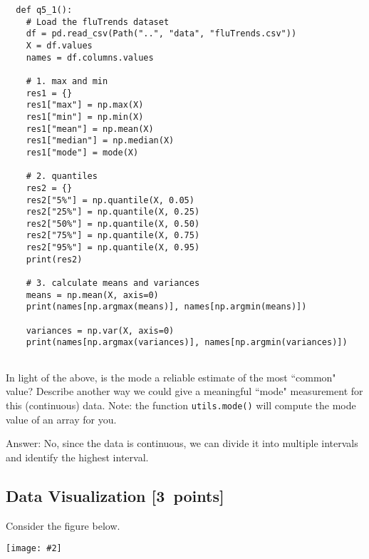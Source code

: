 \documentclass{article}
\newcommand{\blu}[1]{{\textcolor{blu}{#1}}}
\newcommand{\gre}[1]{\textcolor{gre}{#1}}
\newcommand\ans[1]{\par\gre{Answer: #1}}
\let\ask\blu
\newcommand\pts[1]{\textcolor{pointscolour}{[#1~points]}}
\newcommand{\centerfig}[2]{\begin{center}\texttt{[image: \#2]}\end{center}}
\begin{document}
  \begin{verbatim}
  def q5_1():
    # Load the fluTrends dataset
    df = pd.read_csv(Path("..", "data", "fluTrends.csv"))
    X = df.values
    names = df.columns.values

    # 1. max and min
    res1 = {}
    res1["max"] = np.max(X)
    res1["min"] = np.min(X)
    res1["mean"] = np.mean(X)
    res1["median"] = np.median(X)
    res1["mode"] = mode(X)

    # 2. quantiles
    res2 = {}
    res2["5%"] = np.quantile(X, 0.05) 
    res2["25%"] = np.quantile(X, 0.25) 
    res2["50%"] = np.quantile(X, 0.50) 
    res2["75%"] = np.quantile(X, 0.75) 
    res2["95%"] = np.quantile(X, 0.95) 
    print(res2)

    # 3. calculate means and variances
    means = np.mean(X, axis=0)
    print(names[np.argmax(means)], names[np.argmin(means)])

    variances = np.var(X, axis=0)
    print(names[np.argmax(variances)], names[np.argmin(variances)])
    
  \end{verbatim}
  In light of the above, \ask{is the mode a reliable estimate of the most ``common" value? Describe another way we could give a meaningful ``mode" measurement for this (continuous) data.} Note: the function \texttt{utils.mode()} will compute the mode value of an array for you.
  \ans{
       No, since the data is continuous, we can divide it into multiple intervals and identify the highest interval.
  }

  


  \subsection{Data Visualization \pts{3}}

  Consider the figure below.

  \centerfig{.9}{./figs/visualize-unlabeled}
\end{document}
